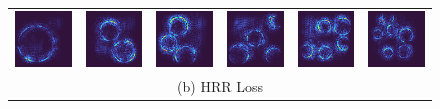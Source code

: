 \documentclass[letterpaper]{article} %
\begin{document}
\begin{figure}[!htbp]
\begin{tabular}{cccccc}
\multicolumn{1}{c}{\includegraphics[width=0.125\columnwidth]{saliency/hrr/circle/ring_1.png}} \hspace{-12pt} &  \multicolumn{1}{c}{\includegraphics[width=0.125\columnwidth]{saliency/hrr/circle/ring_2.png}} \hspace{-12pt} & \multicolumn{1}{c}{\includegraphics[width=0.125\columnwidth]{saliency/hrr/circle/ring_3.png}} \hspace{-12pt} & \multicolumn{1}{c}{\includegraphics[width=0.125\columnwidth]{saliency/hrr/circle/ring_4.png}} \hspace{-12pt} & \multicolumn{1}{c}{\includegraphics[width=0.125\columnwidth]{saliency/hrr/circle/ring_5.png}} \hspace{-12pt} & \multicolumn{1}{c}{\includegraphics[width=0.125\columnwidth]{saliency/hrr/circle/ring_6.png}} \\ 
\multicolumn{6}{c}{(b) HRR Loss} \\


\end{tabular}
\end{figure}
\end{document}
